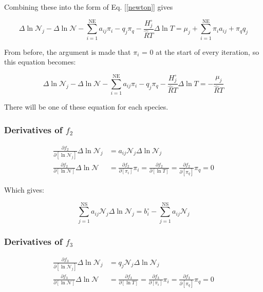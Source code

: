 \documentclass[10pt]{article}
\begin{document}
\begin{flushleft}
Combining these into the form of Eq. [\ref{newton}] gives

\begin{equation}
    \Delta\ln{\mathcal{N}_j} - \Delta \ln{\mathcal{N}} - \sum_{i=1}^\text{NE} a_{ij}\pi_i - q_j \pi_q - \frac{H_j^\circ}{\hat{R}T} \Delta \ln T = \mu_j + \sum_{i=1}^\text{NE} \pi_i a_{ij} + \pi_q q_j
\end{equation}

From before, the argument is made that $\pi_i$ = 0 at the start of every iteration, so this equation becomes:


\begin{equation*}
    \boxed{\Delta\ln{\mathcal{N}_j} - \Delta \ln{\mathcal{N}} - \sum_{i=1}^\text{NE} a_{ij}\pi_i - q_j \pi_q -  \frac{H_j^\circ}{\hat{R}T} \Delta \ln T = -\frac{\mu_j}{\hat{R}T}}
\end{equation*}

There will be one of these equation for each species.  

\subsubsection{Derivatives of $f_2$}

\begin{align}
    \frac{\partial f_2}{\partial[\ln \mathcal{N}_j]} \Delta\ln\mathcal{N}_j &=   a_{ij} \mathcal{N}_j \Delta\ln{\mathcal{N}_j}
    \\ \frac{\partial f_2}{\partial [\ln \mathcal{N}]} \Delta \ln \mathcal{N} &= \frac{\partial f_2}{\partial [\pi_i]} \pi_i = \frac{\partial f_2}{\partial [\ln T]} = \frac{\partial f_2}{\partial [\pi_q]} \pi_q = 0
\end{align}

Which gives:

\begin{equation*}
    \boxed{\sum_{j=1}^\text{NS} a_{ij} \mathcal{N}_j \Delta \ln \mathcal{N}_j = b_i^\circ - \sum_{j=1}^\text{NS} a_{ij} \mathcal{N}_j}
\end{equation*}

\subsubsection{Derivatives of $f_3$}

\begin{align}
    \frac{\partial f_3}{\partial [\ln{\mathcal{N}_j}]} \Delta \ln \mathcal{N}_j &=  q_j \mathcal{N}_j \Delta\ln{\mathcal{N}_j}
    \\ \frac{\partial f_3}{\partial [\ln \mathcal{N}]} \Delta\ln \mathcal{N} &= \frac{\partial f_3}{\partial [\ln T]} = \frac{\partial f_3}{\partial [\pi_i]} \pi_i = \frac{\partial f_3}{\partial [\pi_q]} \pi_q = 0
\end{align}


\end{flushleft}
\end{document}
